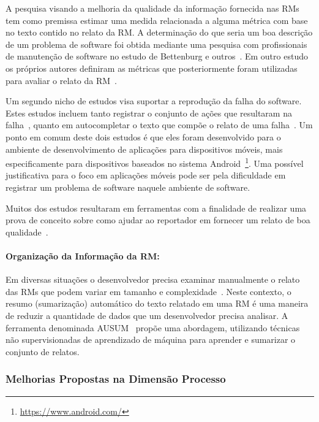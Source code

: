 A pesquisa visando a melhoria da qualidade da informação fornecida nas RMs tem
como premissa estimar uma medida relacionada a alguma métrica com base no texto
contido no relato da RM\@. A determinação do que seria um boa descrição de um
problema de software foi obtida mediante uma pesquisa com profissionais de
manutenção de software no estudo de Bettenburg e outros~\cite{Bettenburg2008a}.
Em outro estudo os próprios autores definiram as métricas que posteriormente
foram utilizadas para avaliar o relato da RM~\cite{Tu:2014:MQI:2677832.2677844}.

Um segundo nicho de estudos visa suportar a reprodução da falha do software.
Estes estudos incluem tanto registrar o conjunto de ações que resultaram na
falha~\cite{White:2015:GRR:2820282.2820291}, quanto em autocompletar o texto que
compõe o relato de uma falha~\cite{moran2015auto}. Um ponto em comum deste dois
estudos é que eles foram desenvolvido para o ambiente de desenvolvimento de
aplicações para dispositivos móveis, mais especificamente para dispositivos
baseados no sistema Android~\footnote{\url{https://www.android.com/}}. Uma
possível justificativa para o foco em aplicações móveis pode ser pela
dificuldade em registrar um problema de software naquele ambiente de software.


Muitos dos estudos resultaram em ferramentas com a finalidade de realizar uma
prova de conceito sobre como ajudar ao reportador em fornecer um relato de boa
qualidade~\cite{Tu:2014:MQI:2677832.2677844, Bettenburg2008a,
	Wu2011a,White:2015:GRR:2820282.2820291,moran2015auto}.

\paragraph{Organização da Informação da RM:}

Em diversas situações o desenvolvedor precisa examinar manualmente o relato das
RMs que podem variar em tamanho e complexidade~\cite{mani2012ausum}.  Neste
contexto, o resumo (sumarização) automático do texto relatado em uma RM é uma
maneira de reduzir a quantidade de dados que um desenvolvedor precisa analisar.
A ferramenta denominada AUSUM~\cite{mani2012ausum} propõe uma abordagem,
utilizando técnicas não supervisionadas de aprendizado de máquina para aprender
e sumarizar o conjunto de relatos.

\subsubsection{Melhorias Propostas na Dimensão Processo}
\label{ssub:melhorias_dim_processo}

